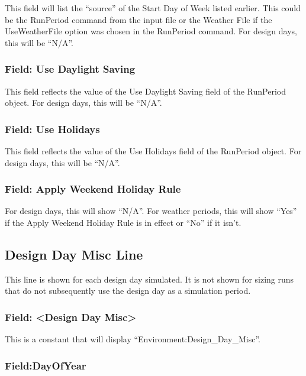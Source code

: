 This field will list the ``source'' of the Start Day of Week listed earlier. This could be the RunPeriod command from the input file or the Weather File if the UseWeatherFile option was chosen in the RunPeriod command. For design days, this will be ``N/A''.

\subsubsection{Field: Use Daylight Saving}\label{field-use-daylight-saving}

This field reflects the value of the Use Daylight Saving field of the RunPeriod object. For design days, this will be ``N/A''.

\subsubsection{Field: Use Holidays}\label{field-use-holidays}

This field reflects the value of the Use Holidays field of the RunPeriod object. For design days, this will be ``N/A''.

\subsubsection{Field: Apply Weekend Holiday Rule}\label{field-apply-weekend-holiday-rule}

For design days, this will show ``N/A''. For weather periods, this will show ``Yes'' if the Apply Weekend Holiday Rule is in effect or ``No'' if it isn't.

\subsection{Design Day Misc Line}\label{design-day-misc-line}

This line is shown for each design day simulated. It is not shown for sizing runs that do not subsequently use the design day as a simulation period.

\subsubsection{Field: \textless{}Design Day Misc\textgreater{}}\label{field-design-day-misc}

This is a constant that will display ``Environment:Design\_Day\_Misc''.

\subsubsection{Field:DayOfYear}\label{fielddayofyear}

